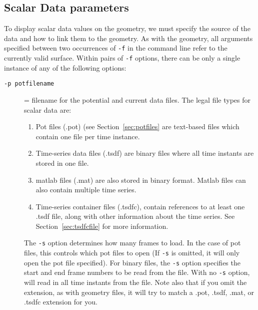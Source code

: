 \subsection{Scalar Data parameters}
\label{sec:scalarparams} 

To display scalar data values on the geometry, we must specify the source 
of the data and how to link them to the geometry.  As with the 
geometry, all arguments specified between two occurrences of \texttt{-f} 
in the command line refer to the currently valid surface.  Within pairs of
\texttt{-f} options, there can be only a single instance of any of the
following options:
%
\begin{description}
    
  \item[{\tt-p potfilename}] = filename for the potential and
    current data files.  The legal file types for scalar data are:
    \begin{enumerate}
      \item Pot files (.pot) (see Section~\ref{sec:potfiles} are 
        text-based files which contain one file per time instance.
        
      \item Time-series data files (.tsdf) are binary files where all
        time instants are stored in one file. 
        
      \item matlab files (.mat) are also stored in binary format.  
        Matlab files can also contain multiple time series. 
        
      \item Time-series container files (.tsdfc), contain references
        to at least one .tsdf file, along with other information
        about the time series.  See Section~\ref{sec:tsdfcfile}
        for more information.
    \end{enumerate}
    
    The \texttt{-s} option determines how many frames to load. 
    In the case of pot files, this controls which pot files to open 
    (If \texttt{-s} is omitted, it will only open the pot file specified). 
    For binary files, the \texttt{-s} option specifies the start
    and end frame numbers to be read from the file.  With no
    \texttt{-s} option, \map{} will read in all time instants from
    the file.  Note also that if you omit the extension, as with
    geometry files, it will try to match a .pot, .tsdf, .mat, or .tsdfc
    extension for you. \\


\end{description}
